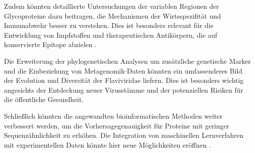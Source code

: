 Zudem könnten detaillierte Untersuchungen der variablen Regionen der Glycoproteine dazu beitragen, die Mechanismen der Wirtsspezifität und Immunabwehr besser zu verstehen. Dies ist besonders relevant für die Entwicklung von Impfstoffen und therapeutischen Antikörpern, die auf konservierte Epitope abzielen \autocite{Fernandez2018}.

Die Erweiterung der phylogenetischen Analysen um zusätzliche genetische Marker und die Einbeziehung von Metagenomik-Daten könnten ein umfassenderes Bild der Evolution und Diversität der Flaviviridae liefern. Dies ist besonders wichtig angesichts der Entdeckung neuer Virusstämme und der potenziellen Risiken für die öffentliche Gesundheit.

Schließlich könnten die angewandten bioinformatischen Methoden weiter verbessert werden, um die Vorhersagegenauigkeit für Proteine mit geringer Sequenzähnlichkeit zu erhöhen. Die Integration von maschinellen Lernverfahren mit experimentellen Daten könnte hier neue Möglichkeiten eröffnen \autocite{Senior2020}.